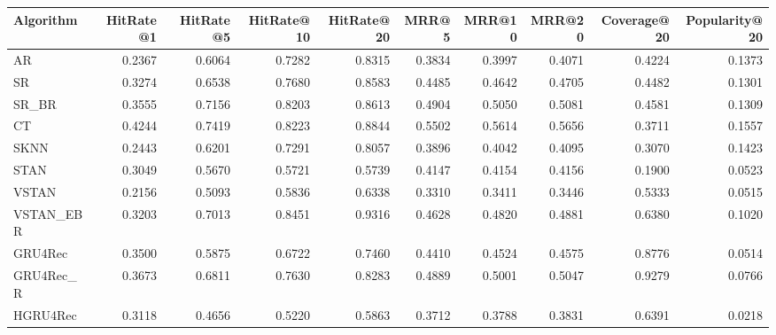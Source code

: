 \begin{tabular}{lrrrrrrrrr}
\toprule
 Algorithm &  HitRate@1 &  HitRate@5 &  HitRate@10 &  HitRate@20 &   MRR@5 &  MRR@10 &  MRR@20 &  Coverage@20 &  Popularity@20 \\
\midrule
        AR &     0.2367 &     0.6064 &      0.7282 &      0.8315 &  0.3834 &  0.3997 &  0.4071 &       0.4224 &         0.1373 \\
        SR &     0.3274 &     0.6538 &      0.7680 &      0.8583 &  0.4485 &  0.4642 &  0.4705 &       0.4482 &         0.1301 \\
     SR\_BR &     0.3555 &     0.7156 &      0.8203 &      0.8613 &  0.4904 &  0.5050 &  0.5081 &       0.4581 &         0.1309 \\
        CT &     0.4244 &     0.7419 &      0.8223 &      0.8844 &  0.5502 &  0.5614 &  0.5656 &       0.3711 &         0.1557 \\
      SKNN &     0.2443 &     0.6201 &      0.7291 &      0.8057 &  0.3896 &  0.4042 &  0.4095 &       0.3070 &         0.1423 \\
      STAN &     0.3049 &     0.5670 &      0.5721 &      0.5739 &  0.4147 &  0.4154 &  0.4156 &       0.1900 &         0.0523 \\
     VSTAN &     0.2156 &     0.5093 &      0.5836 &      0.6338 &  0.3310 &  0.3411 &  0.3446 &       0.5333 &         0.0515 \\
 VSTAN\_EBR &     0.3203 &     0.7013 &      0.8451 &      0.9316 &  0.4628 &  0.4820 &  0.4881 &       0.6380 &         0.1020 \\
   GRU4Rec &     0.3500 &     0.5875 &      0.6722 &      0.7460 &  0.4410 &  0.4524 &  0.4575 &       0.8776 &         0.0514 \\
 GRU4Rec\_R &     0.3673 &     0.6811 &      0.7630 &      0.8283 &  0.4889 &  0.5001 &  0.5047 &       0.9279 &         0.0766 \\
  HGRU4Rec &     0.3118 &     0.4656 &      0.5220 &      0.5863 &  0.3712 &  0.3788 &  0.3831 &       0.6391 &         0.0218 \\
\bottomrule
\end{tabular}
